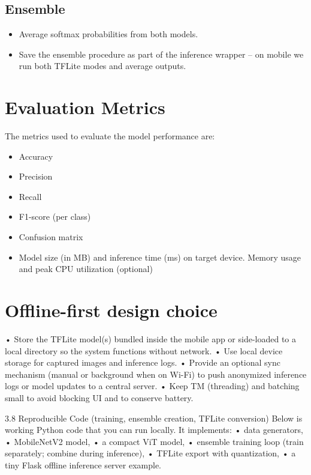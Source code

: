 \subsection{Ensemble}
\begin{itemize}
	\item Average softmax probabilities from both models.
	\item Save the ensemble procedure as part of the inference wrapper -- on mobile we run both TFLite modes and average outputs.
\end{itemize}

\section{Evaluation Metrics}
The metrics  used to evaluate the model performance are:
\begin{itemize}
	\item Accuracy
	\item Precision
	\item Recall
	\item F1-score (per class) 
	\item Confusion matrix
	\item Model size (in MB) and inference time (ms) on target device.
	Memory usage and peak CPU utilization (optional)
\end{itemize}

\section{Offline-first design choice}


• Store the TFLite model(s) bundled inside the mobile app or side-loaded to a local directory so the system functions without network.
• Use local device storage for captured images and inference logs.
• Provide an optional sync mechanism (manual or background when on Wi-Fi) to push anonymized inference logs or model updates to a central server.
• Keep TM (threading) and batching small to avoid blocking UI and to conserve battery.

3.8 Reproducible Code (training, ensemble creation, TFLite conversion)
Below is working Python code that you can run locally. It implements:
• data generators,
• MobileNetV2 model,
• a compact ViT model,
• ensemble training loop (train separately; combine during inference),
• TFLite export with quantization,
• a tiny Flask offline inference server example.

